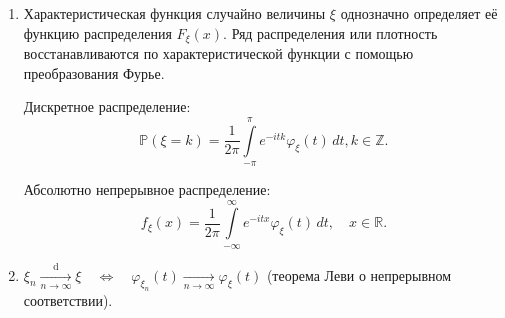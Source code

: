 \begin{namedthm}
\begin{enumerate}
        \item 
            Характеристическая функция случайно величины $\xi$ однозначно определяет её функцию распределения $F_{\xi}(x)$. 
            Ряд распределения или плотность восстанавливаются по характеристической функции с помощью преобразования Фурье.
            
            Дискретное распределение:
            \begin{equation*}
                \mathbb{P}(\xi=k)=\frac{1}{2 \pi} \int\limits_{-\pi}^{\pi} e^{-i t k} \varphi_{\xi}(t) \, d t, k \in \mathbb{Z}.
            \end{equation*}
            
            Абсолютно непрерывное распределение:
            \begin{equation*}
                f_{\xi}(x)=\frac{1}{2 \pi} \int\limits_{-\infty}^{\infty} e^{-i t x} \varphi_{\xi}(t) \, d t, \quad x \in \mathbb{R}.
            \end{equation*}
        \item 
            $\xi_n \xrightarrow[n \to \infty]{\text{d}} \xi \quad \Leftrightarrow \quad \varphi_{\xi_{n}}(t) \xrightarrow[n \to \infty]{} \varphi_{\xi}(t)$ (теорема Леви о непрерывном соответствии).
    \end{enumerate}
\end{namedthm}

